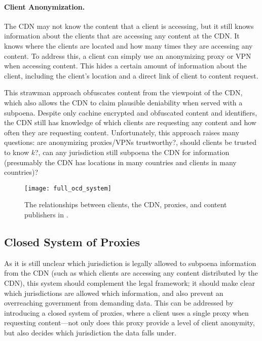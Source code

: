 \paragraph{Client Anonymization.}  The CDN may not know the content that a client is accessing, but it 
still knows information about the clients that are accessing any content at the CDN.  It knows 
where the clients are located and how many times they are accessing any content.  To address this, 
a client can simply use an anonymizing proxy or VPN when accessing content.  This hides a certain 
amount of information about the client, including the client's location and a direct link of 
client to content request.

This strawman approach obfuscates content from the viewpoint of the CDN, which also allows the CDN 
to claim plausible deniability when served with a subpoena.  Despite only cachine encrypted and obfuscated 
content and identifiers, the CDN still has knowledge of which clients are requesting any content and how often 
they are requesting content.  Unfortunately, this approach raises 
many questions: are anonymizing proxies/VPNs trustworthy?, should clients be trusted to know $k$?, 
can any jurisdiction still subpoena the CDN for information (presumably the CDN has locations in many 
countries and clients in many countries)?

\begin{figure*}[t!]
\centering
\texttt{[image: full\_ocd\_system]}
\caption{The relationships between clients, the CDN, proxies, and content publishers in 
\system{}.}
\label{fig:ocd_overview}
\end{figure*}


\subsection{Closed System of Proxies}
\label{sec:proxies}
As it is still unclear which jurisdiction is legally allowed to subpoena information from the CDN (such as which 
clients are accessing any content distributed by the CDN), this 
system should complement the legal framework; it should make clear which jurisdictions are allowed 
which information, and also prevent an overreaching government from demanding data.  This 
can be addressed by introducing a closed system of proxies, where a client uses a single proxy when requesting 
content---not only does this proxy provide a level of client anonymity, but also decides which jurisdiction 
the data falls under.  


